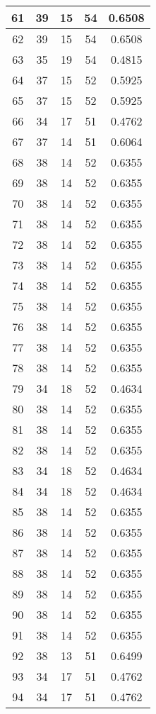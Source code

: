 \documentclass[letterpaper, 12pt]{article}
\begin{document}
\begin{longtable}{|c|c|c|c|c|}
\hline
61 & 39 & 15 & 54 & 0.6508 \\
\hline
62 & 39 & 15 & 54 & 0.6508 \\
\hline
63 & 35 & 19 & 54 & 0.4815 \\
\hline
64 & 37 & 15 & 52 & 0.5925 \\
\hline
65 & 37 & 15 & 52 & 0.5925 \\
\hline
66 & 34 & 17 & 51 & 0.4762 \\
\hline
67 & 37 & 14 & 51 & 0.6064 \\
\hline
68 & 38 & 14 & 52 & 0.6355 \\
\hline
69 & 38 & 14 & 52 & 0.6355 \\
\hline
70 & 38 & 14 & 52 & 0.6355 \\
\hline
71 & 38 & 14 & 52 & 0.6355 \\
\hline
72 & 38 & 14 & 52 & 0.6355 \\
\hline
73 & 38 & 14 & 52 & 0.6355 \\
\hline
74 & 38 & 14 & 52 & 0.6355 \\
\hline
75 & 38 & 14 & 52 & 0.6355 \\
\hline
76 & 38 & 14 & 52 & 0.6355 \\
\hline
77 & 38 & 14 & 52 & 0.6355 \\
\hline
78 & 38 & 14 & 52 & 0.6355 \\
\hline
79 & 34 & 18 & 52 & 0.4634 \\
\hline
80 & 38 & 14 & 52 & 0.6355 \\
\hline
81 & 38 & 14 & 52 & 0.6355 \\
\hline
82 & 38 & 14 & 52 & 0.6355 \\
\hline
83 & 34 & 18 & 52 & 0.4634 \\
\hline
84 & 34 & 18 & 52 & 0.4634 \\
\hline
85 & 38 & 14 & 52 & 0.6355 \\
\hline
86 & 38 & 14 & 52 & 0.6355 \\
\hline
87 & 38 & 14 & 52 & 0.6355 \\
\hline
88 & 38 & 14 & 52 & 0.6355 \\
\hline
89 & 38 & 14 & 52 & 0.6355 \\
\hline
90 & 38 & 14 & 52 & 0.6355 \\
\hline
91 & 38 & 14 & 52 & 0.6355 \\
\hline
92 & 38 & 13 & 51 & 0.6499 \\
\hline
93 & 34 & 17 & 51 & 0.4762 \\
\hline
94 & 34 & 17 & 51 & 0.4762 \\

\end{longtable}
\end{document}
